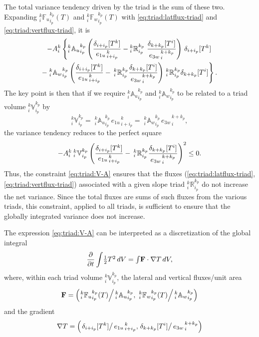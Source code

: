 \documentclass[NEMO_book]{subfiles}
\begin{document}
The total variance tendency driven by the triad is the sum of these
two. Expanding $_i^k{\mathbb{F}_u}_{i_p}^{k_p} (T)$ and
$_i^k{\mathbb{F}_w}_{i_p}^{k_p} (T)$ with \eqref{eq:triad:latflux-triad} and
\eqref{eq:triad:vertflux-triad}, it is
\begin{multline*}
-{A}_i^k\left \{
{ } _i^k{\mathbb{A}_u}_{i_p}^{k_p}
  \left(
    \frac{ \delta_{i+ i_p}[T^k] }{ {e_{1u}}_{\,i + i_p}^{\,k} }
    - {_i^k\mathbb{R}_{i_p}^{k_p}} \
    \frac{ \delta_{k+k_p} [T^i] }{{e_{3w}}_{\,i}^{\,k+k_p} }\right)\,\delta_{i+ i_p}[T^k] \right.\\
- \left. { } _i^k{\mathbb{A}_w}_{i_p}^{k_p}
  \left(
    \frac{ \delta_{i+ i_p}[T^k] }{ {e_{1u}}_{\,i + i_p}^{\,k} }
    -{\:}_i^k\mathbb{R}_{i_p}^{k_p}
    \frac{ \delta_{k+k_p} [T^i] }{{e_{3w}}_{\,i}^{\,k+k_p} }
  \right) {\,}_i^k\mathbb{R}_{i_p}^{k_p}\delta_{k+ k_p}[T^i]
\right \}.
\end{multline*}
The key point is then that if we require
$_i^k{\mathbb{A}_u}_{i_p}^{k_p}$ and $_i^k{\mathbb{A}_w}_{i_p}^{k_p}$
to be related to a triad volume $_i^k\mathbb{V}_{i_p}^{k_p}$ by
\begin{equation}
  \label{eq:triad:V-A}
  _i^k\mathbb{V}_{i_p}^{k_p}
  ={\;}_i^k{\mathbb{A}_u}_{i_p}^{k_p}\,{e_{1u}}_{\,i + i_p}^{\,k}
  ={\;}_i^k{\mathbb{A}_w}_{i_p}^{k_p}\,{e_{3w}}_{\,i}^{\,k + k_p},
\end{equation}
the variance tendency reduces to the perfect square
\begin{equation}
  \label{eq:triad:perfect-square}
  -{A}_i^k{\:} _i^k\mathbb{V}_{i_p}^{k_p}
  \left(
    \frac{ \delta_{i+ i_p}[T^k] }{ {e_{1u}}_{\,i + i_p}^{\,k} }
    -{\:}_i^k\mathbb{R}_{i_p}^{k_p}
    \frac{ \delta_{k+k_p} [T^i] }{{e_{3w}}_{\,i}^{\,k+k_p} }
  \right)^2\leq 0.
\end{equation}
Thus, the constraint \eqref{eq:triad:V-A} ensures that the fluxes (\ref{eq:triad:latflux-triad}, \ref{eq:triad:vertflux-triad}) associated
with a given slope triad $_i^k\mathbb{R}_{i_p}^{k_p}$ do not increase
the net variance. Since the total fluxes are sums of such fluxes from
the various triads, this constraint, applied to all triads, is
sufficient to ensure that the globally integrated variance does not
increase.

The expression \eqref{eq:triad:V-A} can be interpreted as a discretization
of the global integral
\begin{equation}
  \label{eq:triad:cts-var}
  \frac{\partial}{\partial t}\int\!\textstyle\frac{1}{2} T^2\, dV =
  \int\!\mathbf{F}\cdot\nabla T\, dV,
\end{equation}
where, within each triad volume $_i^k\mathbb{V}_{i_p}^{k_p}$, the
lateral and vertical fluxes/unit area
\[
\mathbf{F}=\left(
\left.{}_i^k{\mathbb{F}_u}_{i_p}^{k_p} (T)\right/{}_i^k{\mathbb{A}_u}_{i_p}^{k_p},
\left.{\:}_i^k{\mathbb{F}_w}_{i_p}^{k_p} (T)\right/{}_i^k{\mathbb{A}_w}_{i_p}^{k_p}
 \right)
\]
and the gradient
 \[\nabla T = \left(
\left.\delta_{i+ i_p}[T^k] \right/ {e_{1u}}_{\,i + i_p}^{\,k},
\left.\delta_{k+ k_p}[T^i] \right/ {e_{3w}}_{\,i}^{\,k + k_p}
\right)
\]
\end{document}
